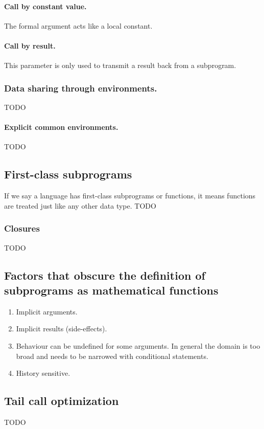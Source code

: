 \paragraph{Call by constant value.} The formal argument acts like a local constant.
\paragraph{Call by result.} This parameter is only used to transmit a result back from a subprogram. 

\subsubsection{Data sharing through environments.}
TODO
\paragraph{Explicit common environments.}
TODO

\subsection{First-class subprograms}
If we say a language has first-class subprograms or functions, it means functions are treated just like any other data type. TODO

\subsubsection{Closures}
TODO

\subsection{Factors that obscure the definition of subprograms as mathematical functions}
\begin{enumerate}
\item Implicit arguments.
\item Implicit results (side-effects).
\item Behaviour can be undefined for some arguments. In general the domain is too broad and needs to be narrowed with conditional statements.
\item History sensitive.
\end{enumerate}

\subsection{Tail call optimization}
TODO



